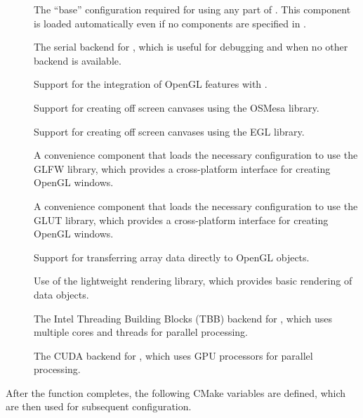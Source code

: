 \begin{description}
\item[]
  The ``base'' configuration required for using any part of \VTKm.
  This component is loaded automatically even if no components are specified in .
\item[]
  The serial backend for \VTKm, which is useful for debugging and when no other backend is available.
\item[]
  Support for the integration of OpenGL features with \VTKm.
\item[]
  Support for creating off screen canvases using the OSMesa library.
\item[]
  Support for creating off screen canvases using the EGL library.
\item[]
  A convenience component that loads the necessary configuration to use the GLFW library, which provides a cross-platform interface for creating OpenGL windows.
\item[]
  A convenience component that loads the necessary configuration to use the GLUT library, which provides a cross-platform interface for creating OpenGL windows.
\item[]
  Support for transferring \VTKm array data directly to OpenGL objects.
\item[]
  Use of the lightweight \VTKm rendering library, which provides basic rendering of \VTKm data objects.
\item[]
  The Intel Threading Building Blocks (TBB) backend for \VTKm, which uses multiple cores and threads for parallel processing.
\item[]
  The CUDA backend for \VTKm, which uses GPU processors for parallel processing.
\end{description}



\newcommand*{\cmakevtkmpackagevariable}[1]{%
  \textsf{#1}%
  \index{#1}%
  \index{CMake!VTK-m package!#1}%
  \index{VTK-m CMake package!variables!#1}}

After the  function completes, the following CMake variables are defined, which are then used for subsequent configuration.

